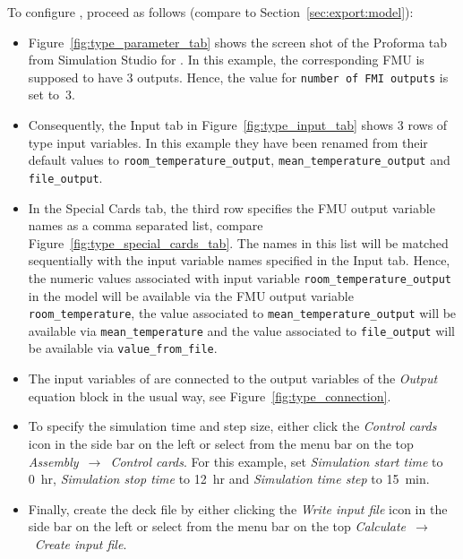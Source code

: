 To configure \typeb, proceed as follows (compare to Section~\ref{sec:export:model}):
\begin{itemize}
  \item Figure~\ref{fig:type_parameter_tab} shows the screen shot of the Proforma tab from Simulation Studio for \typeb.
  In this example, the corresponding FMU is supposed to have 3 outputs.
  Hence, the value for \texttt{number of FMI outputs} is set to~3.

  \item Consequently, the Input tab in Figure~\ref{fig:type_input_tab} shows 3 rows of type input variables.
  In this example they have been renamed from their default values to \texttt{room\_temperature\_output}, \texttt{mean\_temperature\_output} and \texttt{file\_output}.

  \item In the Special Cards tab, the third row specifies the FMU output variable names as a comma separated list, compare Figure~\ref{fig:type_special_cards_tab}.
  The names in this list will be matched sequentially with the input variable names specified in the Input tab.
  Hence, the numeric values associated with \typeb input variable \texttt{room\_temperature\_output} in the \trnsys model will be available via the FMU output variable \texttt{room\_temperature}, the value associated to \texttt{mean\_temperature\_output} will be available via \texttt{mean\_temperature} and the value associated to \texttt{file\_output} will be available via \texttt{value\_from\_file}.

  \item The input variables of \typeb are connected to the output variables of the \emph{Output} equation block in the usual way, see Figure~\ref{fig:type_connection}.

  \item To specify the simulation time and step size, either click the \textit{Control cards} icon in the side bar on the left or select from the menu bar on the top \textit{Assembly}~$\rightarrow$~\textit{Control cards}.
  For this example, set \textit{Simulation start time} to 0~hr, \textit{Simulation stop time} to 12~hr and \textit{Simulation time step} to 15~min.

  \item Finally, create the deck file by either clicking the \textit{Write input file} icon in the side bar on the left or select from the menu bar on the top \textit{Calculate}~$\rightarrow$~\textit{Create input file}.

\end{itemize}

